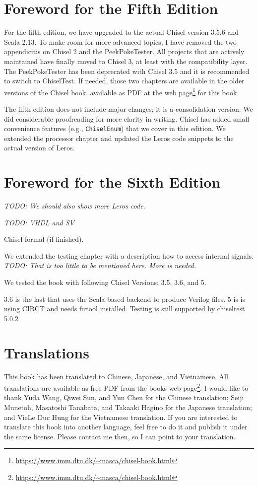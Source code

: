 \documentclass[%
    10pt,
    headinclude, footexclude,
    openright, %
    notitlepage,
    cleardoubleempty,
    headsepline,
    pointlessnumbers,
    bibtotoc, idxtotoc,
    ]{scrbook}
\newcommand{\code}[1]{{\lstinline[basicstyle=\small\ttfamily]{#1}}}
\newcommand{\todo}[1]{{\emph{TODO: #1}}}
\newcommand{\myref}[2]{\href{#1}{#2}}
\renewcommand{\myref}[2]{{#2}{\footnote{\url{#1}}}}
\begin{document}
\section*{Foreword for the Fifth Edition}

For the fifth edition, we have upgraded to the actual Chisel version 3.5.6 and Scala 2.13.
To make room for more advanced topics, I have removed the two appendicitis on
Chisel 2 and the PeekPokeTester. All projects that are actively maintained have finally
moved to Chisel 3, at least with the compatibility layer. The PeekPokeTester has been
deprecated with Chisel 3.5 and it is recommended to switch to ChiselTest.
If needed, those two chapters are available in the older versions of the Chisel book,
available as PDF at the \myref{https://www.imm.dtu.dk/~masca/chisel-book.html}{web page} for this book.

The fifth edition does not include major changes; it is a consolidation version.
We did considerable proofreading for more clarity in writing. Chisel has added small convenience
features (e.g., \code{ChiselEnum}) that we cover in this edition.
We extended the processor chapter and updated the Leros code snippets
to the actual version of Leros.


\section*{Foreword for the Sixth Edition}

\todo{We should also show more Leros code.}

\todo{VHDL and SV}

Chisel formal (if finished).

We extended the testing chapter with a description how to access internal signals. \todo{That is too
little to be mentioned here. More is needed.}

We tested the book with following Chisel Versions: 3.5, 3.6, and 5.

3.6 is the last that uses the Scala based backend to produce Verilog files.
5 is is using CIRCT and needs firtool installed. Testing is still supported by chiseltest 5.0.2




\section*{Translations}

This book has been translated to Chinese, Japanese, and Vietnamese. All translations are available as free PDF
from the books \myref{https://www.imm.dtu.dk/~masca/chisel-book.html}{web page}.
I would like to thank Yuda Wang, Qiwei Sun, and Yun Chen for the Chinese translation;
Seiji Munetoh, Masatoshi Tanabata, and Takaaki Hagino for the Japanese translation;
and VieLe Duc Hung for the Vietnamese translation.
If you are interested to translate this book into another language, feel free to do it and
publish it under the same license. Please contact me then, so I can point to your translation.
\end{document}
